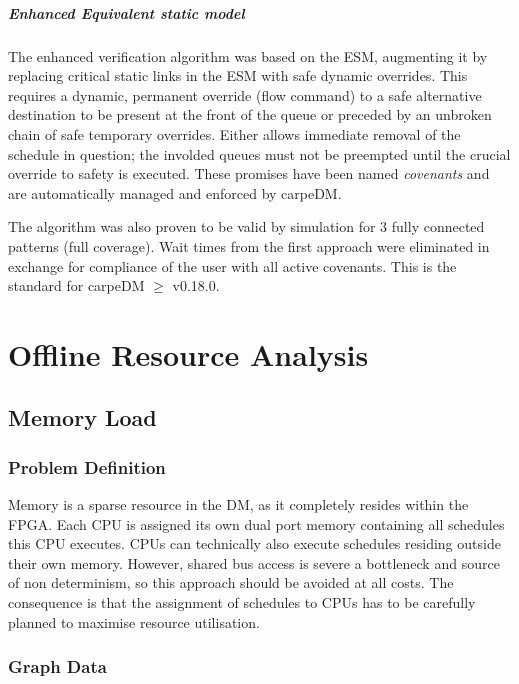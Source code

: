 \paragraph{Enhanced Equivalent static model}
The enhanced verification algorithm was based on the ESM, augmenting it by replacing critical static links in the ESM with safe dynamic overrides. This requires a dynamic, permanent override (flow command) to a safe alternative destination to be present at the front of the queue or preceded by an unbroken chain of safe temporary overrides. Either allows immediate removal of the schedule in question; the involded queues must not be preempted until the crucial override to safety is executed. These promises have been named \emph{covenants} and are automatically managed and enforced by carpeDM.
\par The algorithm was also proven to be valid by simulation for 3 fully connected patterns (full coverage). Wait times from the first approach were eliminated in exchange for compliance of the user with all active covenants.
This is the standard for carpeDM $\ge$ v0.18.0.

\chapter{Offline Resource Analysis}

\section{Memory Load}

\subsection{Problem Definition}
Memory is a sparse resource in the DM, as it completely resides within the FPGA. Each CPU is assigned its own dual port memory containing all schedules this CPU executes. CPUs can technically also execute schedules residing outside their own memory. However, shared bus access is severe a bottleneck and source of non determinism, so this approach should be avoided at all costs. The consequence is that the assignment of schedules to CPUs has to be carefully planned to maximise resource utilisation.


\subsection{Graph Data}

